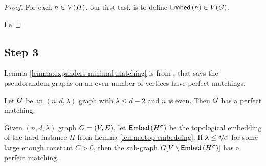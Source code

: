 \documentclass[11pt]{article}
\newcommand{\EnDeeLambda}{(n, d, \lambda)}
\newcommand{\Subdivision}[2]{{#1}^{#2}}
\begin{document}
\begin{lemma}\label{lemma:top-embedding}	
\end{lemma}

\begin{proof}
For each $h \in V(H)$, our first task is to define $\mathsf{Embed}\left(h\right) \in V(G)$.

Le
	
\end{proof}

\subsection{Step 3}

Lemma \ref{lemma:expanders-minimal-matching} is from \citep[Theorem 4.3]{krivelevich2006pseudo}, that says the pseudorandom graphs on an even number of vertices have perfect matchings.

\begin{lemma}\label{lemma:expanders-minimal-matching}
Let $G$ be an $\EnDeeLambda$ graph with $\lambda \leq d - 2$	and $n$ is even. Then $G$ has a perfect matching.
\end{lemma}

\begin{lemma}\label{lemma:perfect-matching}
Given $\EnDeeLambda$ graph $G=(V,E)$, let $\Embedding{\Subdivision{H}{\sigma}}$ be the topological embedding of the hard instance $H$ from Lemma \ref{lemma:top-embedding}.
If $\lambda \leq \nicefrac{d}{C}$ for some large enough constant $C > 0$, then the sub-graph $\Graph[V \setminus \Embedding{\Subdivision{H}{\sigma}}]$ has a perfect matching.	
\end{lemma}
\end{document}

